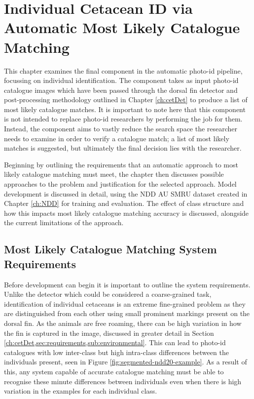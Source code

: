 \chapter{Individual Cetacean ID via Automatic Most Likely Catalogue Matching}\label{ch:ID}

This chapter examines the final component in the automatic photo-id pipeline, focussing on individual identification. The component takes as input photo-id catalogue images which have been passed through the dorsal fin detector and post-processing methodology outlined in Chapter \ref{ch:cetDet} to produce a list of most likely catalogue matches. It is important to note here that this component is not intended to replace photo-id researchers by performing the job for them. Instead, the component aims to vastly reduce the search space the researcher needs to examine in order to verify a catalogue match; a list of most likely matches is suggested, but ultimately the final decision lies with the researcher.

Beginning by outlining the requirements that an automatic approach to most likely catalogue matching must meet, the chapter then discusses possible approaches to the problem and justification for the selected approach. Model development is discussed in detail, using the NDD AU SMRU dataset created in Chapter \ref{ch:NDD} for training and evaluation. The effect of class structure and how this impacts most likely catalogue matching accuracy is discussed, alongside the current limitations of the approach. 

\section{Most Likely Catalogue Matching System Requirements}\label{ch:ID,sec:Requirements}

Before development can begin it is important to outline the system requirements. Unlike the detector which could be considered a coarse-grained task, identification of individual cetaceans is an extreme fine-grained problem as they are distinguished from each other using small prominent markings present on the dorsal fin. As the animals are free roaming, there can be high variation in how the fin is captured in the image, discussed in greater detail in Section \ref{ch:cetDet,sec:requirements,sub:environmental}. This can lead to photo-id catalogues with low inter-class but high intra-class differences between the individuals present, seen in Figure \ref{fig:segmented-ndd20-example}. As a result of this, any system capable of accurate catalogue matching must be able to recognise these minute differences between individuals even when there is high variation in the examples for each individual class. 

